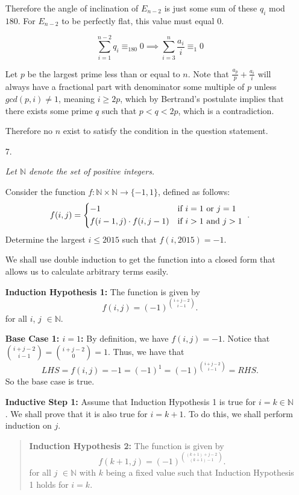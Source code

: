 \documentclass{article}
\begin{document}
\begin{enumerate}
Therefore the angle of inclination of $E_{n-2}$ is just some sum of these $q_i$ mod $180$.
For $E_{n-2}$ to be perfectly flat, this value must equal $0$.

\[ \sum_{i=1}^{n-2} q_i \equiv_{180} 0 \implies {\sum_{i=3}^{n} \frac{a_i}{i} \equiv_{1} 0} \]

Let $p$ be the largest prime less than or equal to $n$.
Note that $\frac{a_p}{p} + \frac{a_i}{i}$ will always have a fractional part with denominator some multiple of $p$ unless $gcd(p,i) \neq 1$, meaning $i \geq 2p$, which by Bertrand's postulate implies that there exists some prime $q$ such that $p < q < 2p$, which is a contradiction.

Therefore no $n$ exist to satisfy the condition in the question statement.

\medskip
\item[7.]%
{\itshape Let $\mathbb{N}$ denote the set of positive integers.

Consider the function $f : \mathbb{N} \times \mathbb{N} \to \{-1,1\}$, defined as follows:
\[ f(i,j) = \begin{dcases*} -1 & if $i = 1$ or $j = 1$ \\ f(i-1,j) \cdot f(i,j-1) & if $i > 1$ and $j > 1$ \end{dcases*}. \]
Determine the largest $i \leq 2015$ such that $f(i,2015) = -1$.}

We shall use double induction to get the function into a closed form that allows us to calculate arbitrary terms easily.

\textbf{Induction Hypothesis 1:} The function is given by
$$f(i, j) = (-1)^{\binom{i + j - 2}{i - 1}}. $$
for all $i$, $j$ $\in \mathbb{N}$.

\textbf{Base Case 1: $i = 1$:} By definition, we have $f(i, j) = -1$. Notice that $\binom{i + j - 2}{i - 1} = \binom{i + j - 2}{0} = 1$. Thus, we have that
$$LHS = f(i, j) = -1 = (-1)^1 = (-1)^{\binom{i + j - 2}{i - 1}} = RHS.$$
So the base case is true.

\textbf{Inductive Step 1:} Assume that Induction Hypothesis 1 is true for $i = k \in \mathbb{N}$. We shall prove that it is also true for $i = k + 1$. To do this, we shall perform induction on $j$.

\begin{quote}
\textbf{Induction Hypothesis 2:} The function is given by
$$f(k + 1, j) = (-1)^{\binom{(k + 1) + j - 2}{(k + 1) - 1}}. $$
for all $j$ $\in \mathbb{N}$ with $k$ being a fixed value such that Induction Hypothesis 1 holds for $i = k$.


\end{quote}
\end{enumerate}
\end{document}

